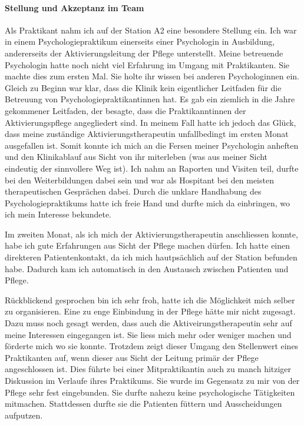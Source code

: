 \paragraph{Stellung und Akzeptanz im Team}
Als Praktikant nahm ich auf der Station A2 eine besondere Stellung ein. Ich war in einem Psychologiepraktikum einerseits einer Psychologin in Ausbildung, andererseits der Aktivierungsleitung der Pflege unterstellt. Meine betreuende Psychologin hatte noch nicht viel Erfahrung im Umgang mit Praktikanten. Sie machte dies zum ersten Mal. Sie holte ihr wissen bei anderen Psychologinnen ein. Gleich zu Beginn war klar, dass die Klinik kein eigentlicher Leitfaden für die Betreuung von Psychologiepraktikantinnen hat. Es gab ein ziemlich in die Jahre gekommener Leitfaden, der besagte, dass die Praktikanntinnen der Aktivierungspflege angegliedert sind. In meinem Fall hatte ich jedoch das Glück, dass meine zuständige Aktivierungstherapeutin unfallbedingt im ersten Monat ausgefallen ist. Somit konnte ich mich an die Fersen meiner Psychologin anheften und den Klinikablauf aus Sicht von ihr miterleben (was aus meiner Sicht eindeutig der sinnvollere Weg ist). Ich nahm an Raporten und Visiten teil, durfte bei den Weiterbildungen dabei sein und war als Hospitant bei den meisten therapeutischen Gesprächen dabei. Durch die unklare Handhabung des Psychologiepraktikums hatte ich freie Hand und durfte mich da einbringen, wo ich mein Interesse bekundete. 

Im zweiten Monat, als ich mich der Aktivierungstherapeutin anschliessen konnte, habe ich gute Erfahrungen aus Sicht der Pflege machen dürfen. Ich hatte einen direkteren Patientenkontakt, da ich mich hautpsächlich auf der Station befunden habe. Dadurch kam ich automatisch in den Austausch zwischen Patienten und Pflege. 

Rückblickend gesprochen bin ich sehr froh, hatte ich die Möglichkeit mich selber zu organisieren. Eine zu enge Einbindung in der Pflege hätte mir nicht zugesagt. Dazu muss noch gesagt werden, dass auch die Aktiveirungstherapeutin sehr auf meine Interessen eingegangen ist. Sie liess mich mehr oder weniger machen und förderte mich wo sie konnte. Trotzdem zeigt dieser Umgang den Stellenwert eines Praktikanten auf, wenn dieser aus Sicht der Leitung primär der Pflege angeschlossen ist. Dies führte bei einer Mitpraktikantin auch zu manch hitziger Diskussion im Verlaufe ihres Praktikums. Sie wurde im Gegensatz zu mir von der Pflege sehr fest eingebunden. Sie durfte nahezu keine psychologische Tätigkeiten mitmachen. Stattdessen durfte sie die Patienten füttern und Ausscheidungen aufputzen. 

